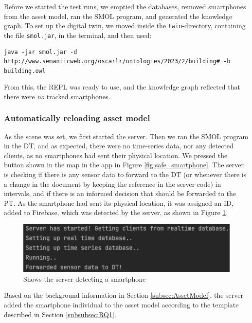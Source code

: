 \documentclass{article}
\begin{document}
Before we started the test runs, we emptied the databases, removed smartphones from the asset model, ran the SMOL program, and generated the knowledge graph. To set up the digital twin, we moved inside the \verb|twin|-directory, containing the file \verb|smol.jar|, in the terminal, and then used:

\begin{small}
\begin{lstlisting}[breaklines]
    java -jar smol.jar -d http://www.semanticweb.org/oscarlr/ontologies/2023/2/building# -b building.owl
\end{lstlisting}
\end{small}
From this, the REPL was ready to use, and the knowledge graph reflected that there were \emph{no} tracked smartphones.

\subsubsection{Automatically reloading asset model}
As the scene was set, we first started the server. Then we ran the SMOL program in the DT, and as expected, there were no time-series data, nor any detected clients, as no smartphones had sent their physical location.
We pressed the button shown in the map in the app in Figure \ref{fig:safe_smartphone}. The server is checking if there is any sensor data to forward to the DT (or whenever there is a change in the document by keeping the reference in the server code) in intervals, and if there is an informed decision that should be forwarded to the PT. As the smartphone had sent its physical location, it was assigned an ID, added to Firebase, which was detected by the server, as shown in Figure \ref{fig:detected_by_server}.

\begin{figure}[H]
    \centering
    \includegraphics[scale=0.50]{graphics/detected_by_server.png}
    \caption{Shows the server detecting a smartphone}
    \label{fig:detected_by_server}
\end{figure}

Based on the background information in Section \ref{subsec:AssetModel}, the server added the smartphone individual to the asset model according to the template described in Section \ref{subsubsec:RQ1}.
\end{document}
